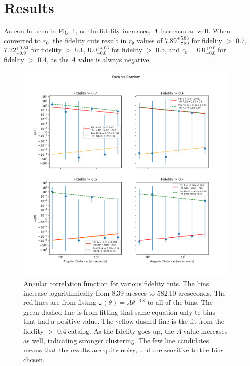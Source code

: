\section{Results}

As can be seen in Fig. \ref{fig:Angular_correlation}, as the fidelity increases, $A$ increases as well. When converted to $r_0$, the fidelity cuts result in $r_0$ values of $7.89_{-7.89}^{+5.83}$ for fidelity $>$ 0.7, $7.22_{-0.9}^{+0.83}$ for fidelity $>$ 0.6, $0.0_{-0.0}^{+4.03}$ for fidelity $>$ 0.5, and $r_0 = 0.0_{-0.0}^{+0.0}$ for fidelity $>$ 0.4, as the $A$ value is always negative. 

\begin{figure}[tbp]
\centering \includegraphics[width=120mm]{clustering_two/Log_4Panel_Data_Vs_Random_bin6_NFalse_Num10000.png}
\caption{Angular correlation function for various fidelity cuts. The bins increase logarithmically from 8.39 arcsecs to 582.10 arcseconds. The red lines are from fitting $\omega(\theta) = A\theta^{-0.8} $ to all of the bins. The green dashed line is from fitting that same equation only to bins that had a positive value. The yellow dashed line is the fit from the fidelity $>$ 0.4 catalog. As the fidelity goes up, the $A$ value increases as well, indicating stronger clustering. The few line candidates means that the results are quite noisy, and are sensitive to the bins chosen.}
\label{fig:Angular_correlation}
\end{figure}

